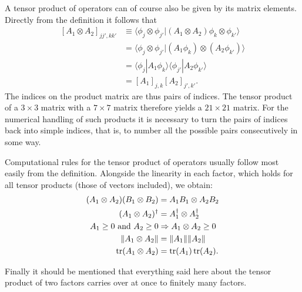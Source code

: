 A tensor product of operators can of course also be given by its matrix elements. Directly from the definition it follows that
\begin{equation}
	\begin{split}
			[A_1\otimes A_2]_{jj',kk'} &\equiv \langle \phi_j\otimes \phi_{j'}|\left(A_1\otimes A_2\right) \phi_k\otimes\phi_{k'}\rangle \\
			&= \langle \phi_j\otimes \phi_{j'}| (A_1\phi_k)\otimes (A_2\phi_{k'})\rangle \\
			&= \langle \phi_j|A_1\phi_k\rangle \langle \phi_{j'}|A_2\phi_{k'}\rangle \\
			&= [A_1]_{j,k}[A_2]_{j',k'}.
	\end{split}
\end{equation}
The indices on the product matrix are thus pairs of indices. The tensor product of a $3\times 3$ matrix with a $7\times 7$ matrix therefore yields a $21\times 21$ matrix. For the numerical handling of such products it is necessary to turn the pairs of indices back into simple indices, that is, to number all the possible pairs consecutively in some way.

Computational rules for the tensor product of operators usually follow most easily from the definition. Alongside the linearity in each factor, which holds for all tensor products (those of vectors included), we obtain:
\begin{align}
	(A_1\otimes A_2)(B_1\otimes B_2) &= A_1B_1\otimes A_2B_2 \\
	(A_1\otimes A_2)^\dag &= A_1^\dag \otimes A_2^\dag \\
	\text{$A_1\ge 0$ and $A_2\ge 0$} &\Rightarrow A_1\otimes A_2 \ge 0 \\
	\|A_1\otimes A_2\| &= \|A_1\|\| A_2\| \\
	\operatorname{tr}(A_1\otimes A_2) &= \operatorname{tr}(A_1)\operatorname{tr}(A_2).
\end{align}

Finally it should be mentioned that everything said here about the tensor product of two factors carries over at once to finitely many factors.

